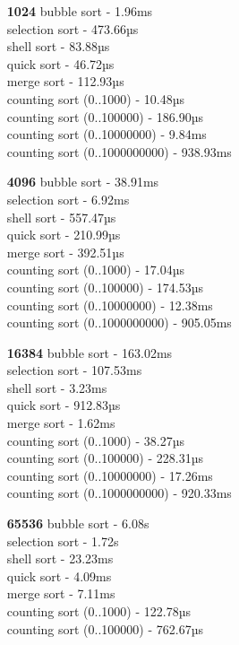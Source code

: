 \documentclass{article}
\begin{document}
\begin{normalsize}
\begin{multicols}{2}
		\begin{enumerate}
			\item [\textbf{1024}] bubble sort - 1.96ms\\
			selection sort - 473.66µs\\
			shell sort - 83.88µs\\
			quick sort - 46.72µs\\
			merge sort - 112.93µs\\
			counting sort (0..1000) - 10.48µs \\
			counting sort (0..100000) - 186.90µs\\
			counting sort (0..10000000) - 9.84ms \\
			counting sort (0..1000000000) - 938.93ms
			\item [\textbf{4096}] bubble sort - 38.91ms\\
			selection sort - 6.92ms\\
			shell sort - 557.47µs\\
			quick sort - 210.99µs\\
			merge sort - 392.51µs\\
			counting sort (0..1000) - 17.04µs\\
			counting sort (0..100000) - 174.53µs\\
			counting sort (0..10000000) - 12.38ms\\
			counting sort (0..1000000000) - 905.05ms
			\item [\textbf{16384}] bubble sort - 163.02ms\\
			selection sort - 107.53ms\\
			shell sort - 3.23ms\\
			quick sort - 912.83µs\\
			merge sort - 1.62ms\\
			counting sort (0..1000) - 38.27µs\\
			counting sort (0..100000) - 228.31µs\\
			counting sort (0..10000000) - 17.26ms\\
			counting sort (0..1000000000) - 920.33ms
			\item [\textbf{65536}] bubble sort - 6.08s\\
			selection sort - 1.72s\\
			shell sort - 23.23ms\\
			quick sort - 4.09ms\\
			merge sort - 7.11ms\\
			counting sort (0..1000) - 122.78µs\\
			counting sort (0..100000) - 762.67µs\\

\end{enumerate}
\end{multicols}
\end{normalsize}
\end{document}
